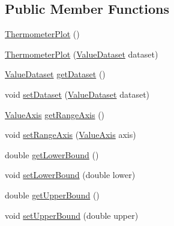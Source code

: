 \subsection*{Public Member Functions}
\begin{DoxyCompactItemize}
\item 
\mbox{\hyperlink{classorg_1_1jfree_1_1chart_1_1plot_1_1_thermometer_plot_a0f1a9f2ffb1315193355aafad2c95221}{Thermometer\+Plot}} ()
\item 
\mbox{\hyperlink{classorg_1_1jfree_1_1chart_1_1plot_1_1_thermometer_plot_acc3f72c3360ed372a868d50cbc30e3ce}{Thermometer\+Plot}} (\mbox{\hyperlink{interfaceorg_1_1jfree_1_1data_1_1general_1_1_value_dataset}{Value\+Dataset}} dataset)
\item 
\mbox{\hyperlink{interfaceorg_1_1jfree_1_1data_1_1general_1_1_value_dataset}{Value\+Dataset}} \mbox{\hyperlink{classorg_1_1jfree_1_1chart_1_1plot_1_1_thermometer_plot_a5208b3720ee7fcb6980a49f2cce81bf3}{get\+Dataset}} ()
\item 
void \mbox{\hyperlink{classorg_1_1jfree_1_1chart_1_1plot_1_1_thermometer_plot_ac864201509947b48e4a47c5a18c7f2c8}{set\+Dataset}} (\mbox{\hyperlink{interfaceorg_1_1jfree_1_1data_1_1general_1_1_value_dataset}{Value\+Dataset}} dataset)
\item 
\mbox{\hyperlink{classorg_1_1jfree_1_1chart_1_1axis_1_1_value_axis}{Value\+Axis}} \mbox{\hyperlink{classorg_1_1jfree_1_1chart_1_1plot_1_1_thermometer_plot_adf4efa3e5c45b90fe1e994852291cda8}{get\+Range\+Axis}} ()
\item 
void \mbox{\hyperlink{classorg_1_1jfree_1_1chart_1_1plot_1_1_thermometer_plot_a1b5f371cd3f13e37737f09372ba85fa9}{set\+Range\+Axis}} (\mbox{\hyperlink{classorg_1_1jfree_1_1chart_1_1axis_1_1_value_axis}{Value\+Axis}} axis)
\item 
double \mbox{\hyperlink{classorg_1_1jfree_1_1chart_1_1plot_1_1_thermometer_plot_aaf4768e80d5df9af624c7c1e83dc8d75}{get\+Lower\+Bound}} ()
\item 
void \mbox{\hyperlink{classorg_1_1jfree_1_1chart_1_1plot_1_1_thermometer_plot_a06f3bbb5ab10b9ff9fb9a4a8ba4f70d9}{set\+Lower\+Bound}} (double lower)
\item 
double \mbox{\hyperlink{classorg_1_1jfree_1_1chart_1_1plot_1_1_thermometer_plot_a075c87a92b66a6895c411e1c674670fe}{get\+Upper\+Bound}} ()
\item 
void \mbox{\hyperlink{classorg_1_1jfree_1_1chart_1_1plot_1_1_thermometer_plot_a1a73cf46d74888646303ea48f4dce694}{set\+Upper\+Bound}} (double upper)
\item 

\end{DoxyCompactItemize}
